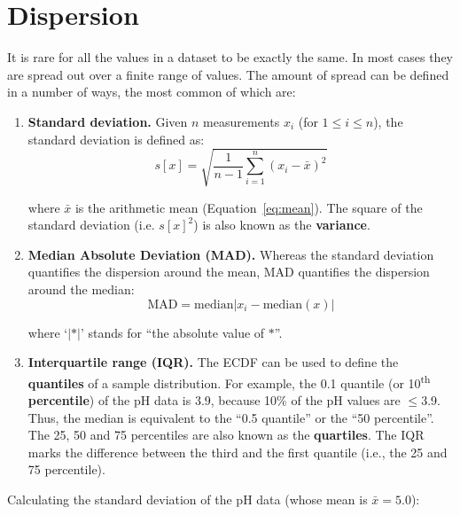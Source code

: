 \section{Dispersion}
\label{sec:dispersion}

It is rare for all the values in a dataset to be exactly the same. In
most cases they are spread out over a finite range of values. The
amount of spread can be defined in a number of ways, the most common
of which are:

\begin{enumerate}

\item{\bf Standard deviation.} Given $n$ measurements $x_i$ (for $1
  \leq i \leq n$), the standard deviation is defined as:
\begin{equation}
  s[x] = \sqrt{\frac{1}{n-1}\sum\limits_{i=1}^{n}(x_i-\bar{x})^2}
  \label{eq:stdev}
\end{equation}

\noindent where $\bar{x}$ is the arithmetic mean
(Equation~\ref{eq:mean}). The square of the standard deviation
(i.e. $s[x]^2$) is also known as the \textbf{variance}.

\item{\bf Median Absolute Deviation (MAD).} Whereas the standard
  deviation quantifies the dispersion around the mean, MAD quantifies
  the dispersion around the median:
  \begin{equation}
    \mbox{MAD} = \mbox{median}|x_i - \mbox{median}(x)|
    \label{eq:MAD}
  \end{equation}

  \noindent where `$|\ast|$' stands for ``the absolute value of
  $\ast$''.
  
\item{\bf Interquartile range (IQR).} The ECDF can be used to define
  the \textbf{quantiles} of a sample distribution. For example, the
  0.1 quantile (or 10\textsuperscript{th} \textbf{percentile}) of the
  pH data is 3.9, because 10\% of the pH values are $\leq$3.9. Thus,
  the median is equivalent to the ``0.5 quantile'' or the ``50
  percentile''. The 25, 50 and 75 percentiles are also known as the
  \textbf{quartiles}. The IQR marks the difference between the third
  and the first quantile (i.e., the 25 and 75 percentile).
  
\end{enumerate}

Calculating the standard deviation of the pH data (whose mean is
$\bar{x} = 5.0$):

